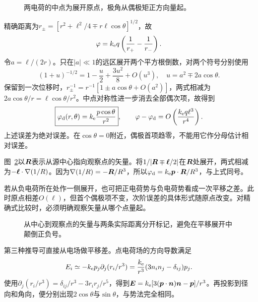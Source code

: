 \begin{figure}[H]\centering
{}
\caption{两电荷的中点为展开原点，极角从偶极矩正方向量起。}\label{fig:es1-e6-q}
\end{figure}
\begin{solution}
精确距离为$r_\pm=[r^2+\ell^2/4\mp r\ell\cos\theta]^{1/2}$，故
\[\varphi=k_{\rm e} q\left(\frac1{r_+}-\frac1{r_-}\right).\]
令$a=\ell/(2r)$。只在$|a|\ll1$的远区展开两个平方根倒数，对两个符号分别使用
\[(1+u)^{-1/2}=1-\frac u2+\frac{3u^2}{8}+O(u^3),\quad
u=a^2\mp2a\cos\theta.
\]
保留到一次位移时，$r_\pm^{-1}=r^{-1}[1\pm a\cos\theta+O(a^2)]$，两式相减为$2a\cos\theta/r=\ell\cos\theta/r^2$。中点对称性进一步消去全部偶次项，故得到
\[\boxed{\varphi_{\rm d}(r,\theta)=k_{\rm e}\frac{p\cos\theta}{r^2}},\qquad
\varphi-\varphi_{\rm d}=O\left(\frac{k_{\rm e} q\ell^3}{r^4}\right).\]
上述误差为绝对误差。在$\cos\theta=0$附近，偶极首项趋零，不能用它作分母估计相对误差。

图~\ref{fig:es1-e6-s}以$\bm{R}$表示从源中心指向观察点的矢量。将$1/|\bm{R}\mp\bm{\ell}/2|$在$\bm{R}$处展开，两式相减为$-\bm{\ell}\cdot\nabla(1/R)$。因为$\nabla(1/R)=-\bm{R}/R^3$，所以$\varphi_{\rm d}=k_{\rm e}\bm{p}\cdot\bm{R}/R^3$，与上式同号。

若从负电荷所在处作一侧展开，也可把正电荷势与负电荷势看成一次平移之差。此时原点相差$O(\ell)$，但首个偶极项不变，次阶误差的具体形式随原点改变。对精确式比较时，必须明确观察矢量从哪个点量起。
\begin{figure}[H]\centering
{}
\caption{从中心到观察点的矢量与两条实际距离分开标记，避免在平移展开中颠倒正负号。}\label{fig:es1-e6-s}
\end{figure}


第三种推导可直接从电场做平移差。点电荷场的方向导数满足
\[E_i\simeq-k_{\rm e} p_j\partial_j(r_i/r^3)
=\frac{k_{\rm e}}{r^3}(3n_in_j-\delta_{ij})p_j.\]
使用$\partial_j(r_i/r^3)=\delta_{ij}/r^3-3r_ir_j/r^5$，得到$\bm{E}=k_{\rm e}[3(\bm{p}\cdot\bm{n})\bm{n}-\bm{p}]/r^3$。再投影到径向和角向，便分别出现$2\cos\theta$与$\sin\theta$，与势法完全相同。
\end{solution}

